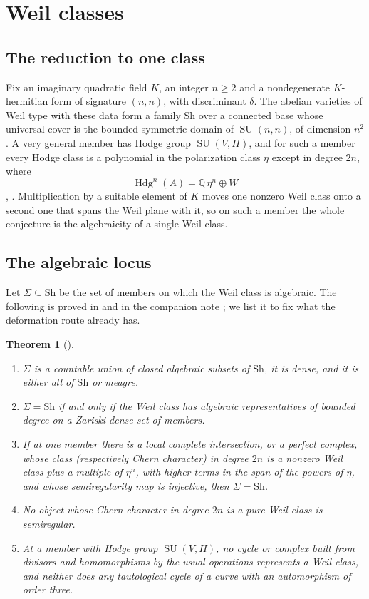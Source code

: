 \documentclass[11pt]{amsart}
\newtheorem{theorem}{Theorem}[section]
\theoremstyle{definition}
\theoremstyle{remark}
\newcommand{\QQ}{\mathbb{Q}}
\newcommand{\Hdg}{\operatorname{Hdg}}
\newcommand{\SU}{\operatorname{SU}}
\newcommand{\Sh}{\mathrm{Sh}}
\begin{document}
\section{Weil classes}\label{sec:weil}

\subsection{The reduction to one class}

Fix an imaginary quadratic field $K$, an integer $n\ge2$ and a nondegenerate
$K$-hermitian form of signature $(n,n)$, with discriminant $\delta$. The
abelian varieties of Weil type with these data form a family $\Sh$ over a
connected base whose universal cover is the bounded symmetric domain of
$\SU(n,n)$, of dimension $n^{2}$. A very general member has Hodge group
$\SU(V,H)$, and for such a member every Hodge class is a polynomial in the
polarization class $\eta$ except in degree $2n$, where
\[
  \Hdg^{n}(A)=\QQ\,\eta^{n}\oplus W
\]
\cite{BhH8}, \cite[Theorem~4]{Wei77}. Multiplication by a suitable
element of $K$ moves one nonzero Weil class onto a second one that spans the
Weil plane with it, so on such a member the whole conjecture is the
algebraicity of a single Weil class.

\subsection{The algebraic locus}

Let $\Sigma\subseteq\Sh$ be the set of members on which the Weil class is
algebraic. The following is proved in \cite{BhH8} and in the companion note
\cite{BhW}; we list it to fix what the deformation route already has.

\begin{theorem}[{\cite{BhH8,BhW}}]\label{thm:locus}
\begin{enumerate}[label=(\alph*)]
\item $\Sigma$ is a countable union of closed algebraic subsets of $\Sh$,
it is dense, and it is either all of $\Sh$ or meagre.
\item $\Sigma=\Sh$ if and only if the Weil class has algebraic
representatives of bounded degree on a Zariski-dense set of members.
\item If at one member there is a local complete intersection, or a perfect
complex, whose class (respectively Chern character) in degree $2n$ is a
nonzero Weil class plus a multiple of $\eta^{n}$, with higher terms in the
span of the powers of $\eta$, and whose semiregularity map is injective,
then $\Sigma=\Sh$.
\item No object whose Chern character in degree $2n$ is a pure Weil class is
semiregular.
\item At a member with Hodge group $\SU(V,H)$, no cycle or complex built from
divisors and homomorphisms by the usual operations represents a Weil class,
and neither does any tautological cycle of a curve with an automorphism of
order three.
\end{enumerate}
\end{theorem}
\end{document}
